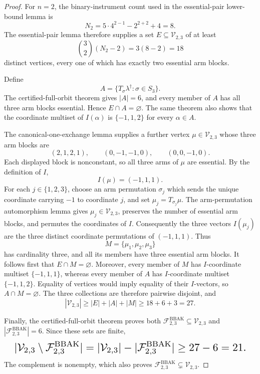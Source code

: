 \documentclass{article}
\begin{document}
\begin{proof}
For \(n=2\), the binary-instrument count used in the essential-pair lower-bound lemma is
\[
N_2=5\cdot4^{2-1}-2^{2+2}+4=8.
\]
The essential-pair lemma therefore supplies a set \(E\subseteq\mathcal V_{2,3}\) of at least
\[
\binom{3}{2}(N_2-2)=3(8-2)=18
\]
distinct vertices, every one of which has exactly two essential arm blocks.

Define
\[
A=\{T_\sigma\lambda^\dagger:\sigma\in S_3\}.
\]
The certified-full-orbit theorem gives \(|A|=6\), and every member of \(A\) has all three arm blocks essential. Hence \(E\cap A=\varnothing\). The same theorem also shows that the coordinate multiset of \(I(\alpha)\) is \(\{-1,1,2\}\) for every \(\alpha\in A\).

The canonical-one-exchange lemma supplies a further vertex \(\mu\in\mathcal V_{2,3}\) whose three arm blocks are
\[
(2,1,2,1),\qquad (0,-1,-1,0),\qquad (0,0,-1,0).
\]
Each displayed block is nonconstant, so all three arms of \(\mu\) are essential. By the definition of \(I\),
\[
I(\mu)=(-1,1,1).
\]
For each \(j\in\{1,2,3\}\), choose an arm permutation \(\sigma_j\) which sends the unique coordinate carrying \(-1\) to coordinate \(j\), and set \(\mu_j=T_{\sigma_j}\mu\). The arm-permutation automorphism lemma gives \(\mu_j\in\mathcal V_{2,3}\), preserves the number of essential arm blocks, and permutes the coordinates of \(I\). Consequently the three vectors \(I(\mu_j)\) are the three distinct coordinate permutations of \((-1,1,1)\). Thus
\[
M=\{\mu_1,\mu_2,\mu_3\}
\]
has cardinality three, and all its members have three essential arm blocks. It follows first that \(E\cap M=\varnothing\). Moreover, every member of \(M\) has \(I\)-coordinate multiset \(\{-1,1,1\}\), whereas every member of \(A\) has \(I\)-coordinate multiset \(\{-1,1,2\}\). Equality of vertices would imply equality of their \(I\)-vectors, so \(A\cap M=\varnothing\). The three collections are therefore pairwise disjoint, and
\[
|\mathcal V_{2,3}|\ge |E|+|A|+|M|\ge18+6+3=27.
\]

Finally, the certified-full-orbit theorem proves both \(\mathcal F^{\mathrm{BBAK}}_{2,3}\subseteq\mathcal V_{2,3}\) and \(|\mathcal F^{\mathrm{BBAK}}_{2,3}|=6\). Since these sets are finite,
\[
\makebox[\linewidth][c]{\resizebox{0.98\linewidth}{!}{\par\noindent \makebox[\linewidth][c]{\resizebox{0.98\linewidth}{!}{\(\displaystyle \displaystyle |\mathcal V_{2,3}\setminus\mathcal F^{\mathrm{BBAK}}_{2,3}|=|\mathcal V_{2,3}|-|\mathcal F^{\mathrm{BBAK}}_{2,3}|\ge27-6=21.\)}}\par\noindent}}
\]
The complement is nonempty, which also proves \(\mathcal F^{\mathrm{BBAK}}_{2,3}\subsetneq\mathcal V_{2,3}\).
\end{proof}
\end{document}
